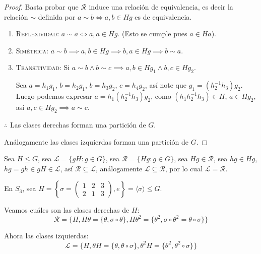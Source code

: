 \begin{proof}
	Basta probar que $\mathcal{R}$ induce una relación de equivalencia, es decir la relación $\sim$ definida por $a \sim b \iff a, b \in Hg$ es de equivalencia.
	\begin{enumerate}[label=\roman*), font=\normalfont]
		\item \textsc{Reflexividad:} $a \sim a \iff a, a \in Hg$. (Esto se cumple pues $a \in Ha$).
		\item \textsc{Simétrica:} $a \sim b \implies a, b \in Hg \implies b, a \in Hg \implies b \sim a$.
		\item \textsc{Transitividad:} Si $a \sim b \land b \sim c \implies a, b \in Hg_1 \land b, c \in Hg_2$. \par
		      Sea $a = h_1 g_1$, $b = h_2 g_1$, $b = h_3 g_2$, $c = h_4 g_2$, así note que $g_1 = (h_2^{-1} h_3) g_2$.
		      Luego podemos expresar $a = h_1 (h_2^{-1} h_3) g_2$, como $(h_1 h_2^{-1} h_3) \in H$, $a \in Hg_2$, así $a, c \in Hg_2 \implies a \sim c$.
	\end{enumerate}

	$\therefore$ Las clases derechas forman una partición de $G$.

	Análogamente las clases izquierdas forman una partición de $G$.
\end{proof}


\begin{enefecto}
	Sea $H \le G$, sea $\mathcal{L} = \{ gH : g \in G \}$, sea $\mathcal{R} = \{ Hg : g \in G \}$, sea $Hg \in \mathcal{R}$, sea $hg \in Hg$, $hg = gh \in gH \in \mathcal{L}$, así $\mathcal{R} \subseteq \mathcal{L}$, análogamente $\mathcal{L} \subseteq \mathcal{R}$, por lo cual $\mathcal{L} = \mathcal{R}$.
\end{enefecto}


\begin{eje}
	En $S_3$, sea $H = \left\{ \sigma = \begin{pmatrix} 1 & 2 & 3 \\ 2 & 1 & 3 \end{pmatrix}, e \right\} = \langle \sigma \rangle \le G$.

	Veamos cuáles son las clases derechas de $H$:
	\begin{equation*}
		\mathcal{R} = \{ H, H\theta = \{ \theta, \sigma \circ \theta \}, H\theta^2 = \{ \theta^2, \sigma \circ \theta^2 = \theta \circ \sigma \} \}
	\end{equation*}

	Ahora las clases izquierdas:
	\begin{equation*}
		\mathcal{L} = \{ H, \theta H = \{ \theta, \theta \circ \sigma \}, \theta^2 H = \{ \theta^2, \theta^2 \circ \sigma \} \}
	\end{equation*}
\end{eje}

